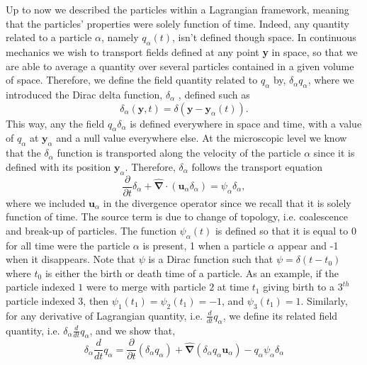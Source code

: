 \documentclass[twocolumn]{My_article}
\newcommand{\nablabh}{\hat{\bm{\nabla}}}
\newcommand{\ddt}{\frac{d}{d t}}
\newcommand{\pddt}{\frac{\partial}{\partial t}}
\begin{document}
Up to now we described the particles within a Lagrangian framework, meaning that the particles' properties were solely function of time.
Indeed, any quantity related to a particle $\alpha$, namely $q_\alpha(t)$, isn't defined though space.
In continuous mechanics we wish to transport fields defined at any point \textbf{y} in space, so that we are able to average a quantity over several particles contained in a given volume of space.
Therefore, we define the field quantity related  to $q_\alpha$ by, $\delta_\alpha q_\alpha$, where we introduced the Dirac delta function, $\delta_\alpha$ \citep{morel2015mathematical}, defined such as
\begin{equation}
    \delta_\alpha(\textbf{y},t) = \delta(\textbf{y}-\textbf{y}_\alpha(t)).
\end{equation}
This way, any the field $q_\alpha \delta_\alpha$ is defined everywhere in space and time, with a value of $q_\alpha$ at $\textbf{y}_\alpha$ and a null value everywhere else.
At the microscopic level we know that the $\delta_\alpha$ function is transported along the velocity of the particle $\alpha$ since it is defined with its position $\textbf{y}_\alpha$.
Therefore, $\delta_\alpha$ follows the transport equation
\begin{equation}
    \pddt \delta_\alpha
    + \nablabh \cdot (\textbf{u}_\alpha  \delta_\alpha)
    = \psi_\alpha \delta_\alpha,
    \label{eq:delta_alpha_dt}
\end{equation}
where we included $\textbf{u}_\alpha$ in the divergence operator since we recall that it is solely function of time.
The source term is due to change of topology, i.e. coalescence and break-up of particles.
The function $\psi_\alpha(t)$ is defined so that it is equal to 0 for all time were the particle $\alpha$ is present, 1 when a particle $\alpha$ appear and -1 when it disappears.
Note that $\psi$ is a Dirac function such that $\psi = \delta(t - t_0)$ where $t_0$ is either the birth or death time of a particle.
As an example, if the particle indexed $1$ were to merge with particle $2$ at time $t_1$ giving birth to a $3^{th}$ particle indexed $3$, then $\psi_1(t_1) = \psi_2(t_1) = -1$, and $\psi_3(t_1) = 1$.
Similarly, for any derivative of Lagrangian quantity, i.e. $\ddt q_\alpha$, we define its related field quantity, i.e. $\delta_\alpha \ddt q_\alpha$, and we show that,
\begin{equation}
    \delta_\alpha \ddt q_\alpha
    = \pddt (\delta_\alpha q_\alpha)
    + \nablabh (\delta_\alpha q_\alpha \textbf{u}_\alpha)
    - q_\alpha \psi_\alpha \delta_\alpha
    \label{eq:delta_q_alpha_dt}
\end{equation}
\end{document}
